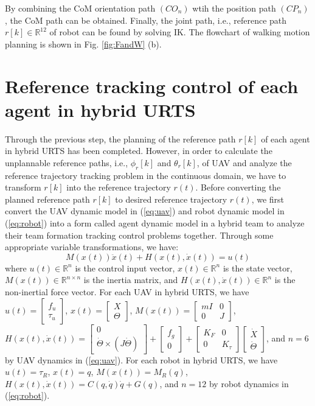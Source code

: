 \documentclass[journal,12pt,onecolumn,draftclsnofoot,]{IEEEtran}
\begin{document}
By combining the CoM orientation path $(CO_n)$ wtih the position path $(CP_n)$, the CoM path can be obtained. Finally, the joint path, i.e., reference path $r[k]\in\mathbb{R}^{12}$ of robot can be found by solving IK. The flowchart of walking motion planning is shown in Fig. \ref{fig:FandW} (b).

\section{Reference tracking control of each agent in hybrid URTS}
Through the previous step, the planning of the reference path $r[k]$ of each agent in hybrid URTS has been completed. However, in order to calculate the unplannable reference paths, i.e., $\phi_r[k]$ and $\theta_r[k]$, of UAV and analyze the reference trajectory tracking problem in the continuous domain, we have to transform $r[k]$ into the reference trajectory $r(t)$. Before converting the planned reference path $r[k]$ to desired reference trajectory $r(t)$, we first convert the UAV dynamic model in (\ref{eq:uav}) and robot dynamic model in (\ref{eq:robot}) into a form called agent dynamic model in a hybrid team to analyze their team formation tracking control problems together. Through some appropriate variable transformations, we have:
\begin{equation} \label{eq:agent} 
    M(x(t))\ddot{x}(t) + H(x(t),\dot{x}(t)) = u(t)
\end{equation}
where $u(t)\in\mathbb{R}^n$ is the control input vector, $x(t)\in\mathbb{R}^n$ is the state vector, $M(x(t))\in\mathbb{R}^{n\times n}$ is the inertia matrix, and $H(x(t),\dot{x}(t))\in\mathbb{R}^n$ is the non-inertial force vector. For each UAV in hybrid URTS, we have $u(t)=\begin{bmatrix}
    f_u \\ \tau_u
\end{bmatrix}$, $x(t)=\begin{bmatrix}
    X \\ \Theta
\end{bmatrix}$, $M(x(t))=\begin{bmatrix}
    mI & 0 \\ 0 & J
\end{bmatrix}$, $H(x(t),\dot{x}(t))=\begin{bmatrix}
    0 \\ \dot{\Theta}\times(J\dot{\Theta})
\end{bmatrix}+\begin{bmatrix}
    f_g \\ 0
\end{bmatrix}+\begin{bmatrix}
    K_F & 0 \\
    0 & K_\tau
\end{bmatrix}\begin{bmatrix}
    \dot{X} \\ \dot{\Theta}
\end{bmatrix}$, and $n=6$ by UAV dynamics in (\ref{eq:uav}). For each robot in hybrid URTS, we have $u(t)=\tau_R$, $x(t)=q$, $M(x(t))=M_R(q)$, $H(x(t),\dot{x}(t))=C(q,\dot{q})\dot{q} + G(q)$, and $n=12$ by robot dynamics in (\ref{eq:robot}).
\end{document}
